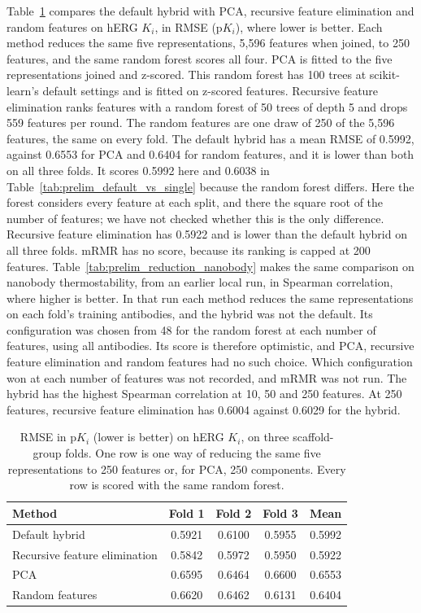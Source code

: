 Table~\ref{tab:prelim_reduction} compares the default hybrid with PCA, recursive feature elimination and random features on hERG $K_i$, in RMSE (p$K_i$), where lower is better. Each method reduces the same five representations, 5,596 features when joined, to 250 features, and the same random forest scores all four. PCA is fitted to the five representations joined and z-scored. This random forest has 100 trees at scikit-learn's default settings and is fitted on z-scored features. Recursive feature elimination ranks features with a random forest of 50 trees of depth 5 and drops 559 features per round. The random features are one draw of 250 of the 5,596 features, the same on every fold. The default hybrid has a mean RMSE of 0.5992, against 0.6553 for PCA and 0.6404 for random features, and it is lower than both on all three folds. It scores 0.5992 here and 0.6038 in Table~\ref{tab:prelim_default_vs_single} because the random forest differs. Here the forest considers every feature at each split, and there the square root of the number of features; we have not checked whether this is the only difference. Recursive feature elimination has 0.5922 and is lower than the default hybrid on all three folds. mRMR has no score, because its ranking is capped at 200 features. Table~\ref{tab:prelim_reduction_nanobody} makes the same comparison on nanobody thermostability, from an earlier local run, in Spearman correlation, where higher is better. In that run each method reduces the same representations on each fold's training antibodies, and the hybrid was not the default. Its configuration was chosen from 48 for the random forest at each number of features, using all antibodies. Its score is therefore optimistic, and PCA, recursive feature elimination and random features had no such choice. Which configuration won at each number of features was not recorded, and mRMR was not run. The hybrid has the highest Spearman correlation at 10, 50 and 250 features. At 250 features, recursive feature elimination has 0.6004 against 0.6029 for the hybrid.

\begin{table}[htbp]
\centering
\small
\begin{tabular}{@{}lcccc@{}}
\toprule
Method & Fold 1 & Fold 2 & Fold 3 & Mean \\
\midrule
Default hybrid & 0.5921 & 0.6100 & 0.5955 & 0.5992 \\
Recursive feature elimination & 0.5842 & 0.5972 & 0.5950 & 0.5922 \\
PCA & 0.6595 & 0.6464 & 0.6600 & 0.6553 \\
Random features & 0.6620 & 0.6462 & 0.6131 & 0.6404 \\
\bottomrule
\end{tabular}
\caption[The default hybrid against PCA, recursive feature elimination and random features on hERG $K_i$]{RMSE in p$K_i$ (lower is better) on hERG $K_i$, on three scaffold-group folds. One row is one way of reducing the same five representations to 250 features or, for PCA, 250 components. Every row is scored with the same random forest.}
\label{tab:prelim_reduction}
\end{table}

